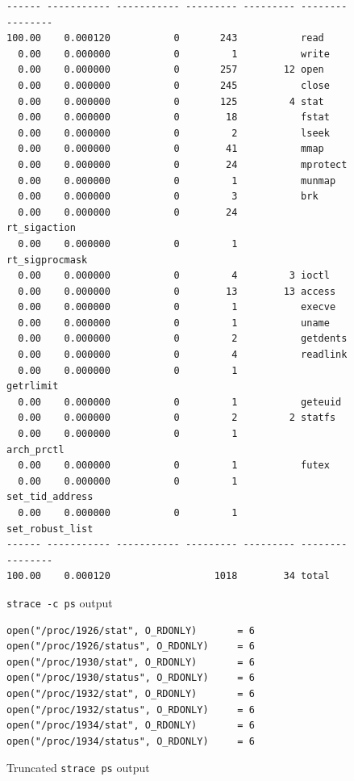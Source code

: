 \documentclass{proc}
\begin{document}
 \begin{figure}[t]
\begin{lstlisting}[linewidth=\linewidth]
% time     seconds  usecs/call     calls    errors syscall
------ ----------- ----------- --------- --------- ----------------
100.00    0.000120           0       243           read
  0.00    0.000000           0         1           write
  0.00    0.000000           0       257        12 open
  0.00    0.000000           0       245           close
  0.00    0.000000           0       125         4 stat
  0.00    0.000000           0        18           fstat
  0.00    0.000000           0         2           lseek
  0.00    0.000000           0        41           mmap
  0.00    0.000000           0        24           mprotect
  0.00    0.000000           0         1           munmap
  0.00    0.000000           0         3           brk
  0.00    0.000000           0        24           rt_sigaction
  0.00    0.000000           0         1           rt_sigprocmask
  0.00    0.000000           0         4         3 ioctl
  0.00    0.000000           0        13        13 access
  0.00    0.000000           0         1           execve
  0.00    0.000000           0         1           uname
  0.00    0.000000           0         2           getdents
  0.00    0.000000           0         4           readlink
  0.00    0.000000           0         1           getrlimit
  0.00    0.000000           0         1           geteuid
  0.00    0.000000           0         2         2 statfs
  0.00    0.000000           0         1           arch_prctl
  0.00    0.000000           0         1           futex
  0.00    0.000000           0         1           set_tid_address
  0.00    0.000000           0         1           set_robust_list
------ ----------- ----------- --------- --------- ----------------
100.00    0.000120                  1018        34 total
 \end{lstlisting}
 \caption{\texttt{strace -c ps} output}
\end{figure}

 \begin{figure}[t]
\begin{lstlisting}[linewidth=\linewidth]
open("/proc/1926/stat", O_RDONLY)       = 6
open("/proc/1926/status", O_RDONLY)     = 6
open("/proc/1930/stat", O_RDONLY)       = 6
open("/proc/1930/status", O_RDONLY)     = 6
open("/proc/1932/stat", O_RDONLY)       = 6
open("/proc/1932/status", O_RDONLY)     = 6
open("/proc/1934/stat", O_RDONLY)       = 6
open("/proc/1934/status", O_RDONLY)     = 6
 \end{lstlisting}
 \caption{Truncated \texttt{strace ps} output}
\end{figure}
\end{document}
